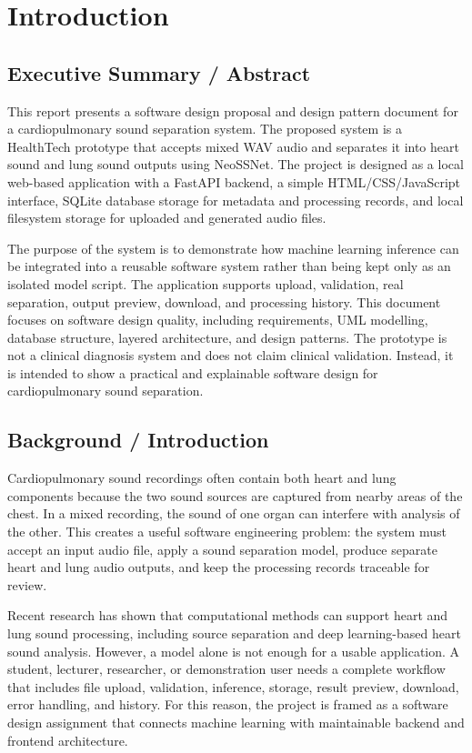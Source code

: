 \chapter{Introduction}

\section{Executive Summary / Abstract}

This report presents a software design proposal and design pattern document for a cardiopulmonary sound separation system. The proposed system is a HealthTech prototype that accepts mixed WAV audio and separates it into heart sound and lung sound outputs using NeoSSNet. The project is designed as a local web-based application with a FastAPI backend, a simple HTML/CSS/JavaScript interface, SQLite database storage for metadata and processing records, and local filesystem storage for uploaded and generated audio files.

The purpose of the system is to demonstrate how machine learning inference can be integrated into a reusable software system rather than being kept only as an isolated model script. The application supports upload, validation, real separation, output preview, download, and processing history. This document focuses on software design quality, including requirements, UML modelling, database structure, layered architecture, and design patterns. The prototype is not a clinical diagnosis system and does not claim clinical validation. Instead, it is intended to show a practical and explainable software design for cardiopulmonary sound separation.

\section{Background / Introduction}

Cardiopulmonary sound recordings often contain both heart and lung components because the two sound sources are captured from nearby areas of the chest. In a mixed recording, the sound of one organ can interfere with analysis of the other. This creates a useful software engineering problem: the system must accept an input audio file, apply a sound separation model, produce separate heart and lung audio outputs, and keep the processing records traceable for review.

Recent research has shown that computational methods can support heart and lung sound processing, including source separation and deep learning-based heart sound analysis. However, a model alone is not enough for a usable application. A student, lecturer, researcher, or demonstration user needs a complete workflow that includes file upload, validation, inference, storage, result preview, download, error handling, and history. For this reason, the project is framed as a software design assignment that connects machine learning with maintainable backend and frontend architecture.

